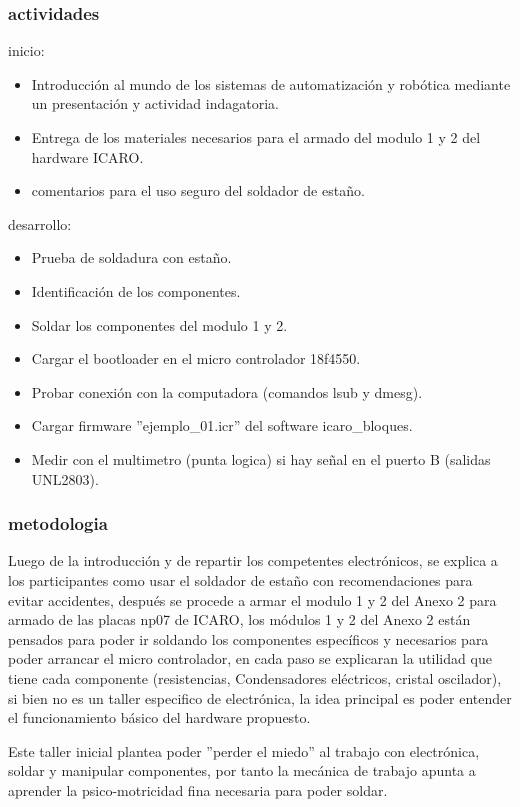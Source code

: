 \subsubsection{actividades}
inicio:
\begin{itemize}
  \item Introducción al mundo de los sistemas de automatización y robótica mediante un presentación y actividad indagatoria.
  \item Entrega de los materiales necesarios para el armado del modulo 1 y 2 del hardware ICARO.
  \item comentarios para el uso seguro del soldador de estaño.
\end{itemize}
desarrollo:
\begin{itemize}
  \item Prueba de soldadura con estaño.
  \item Identificación de los componentes.
  \item Soldar los componentes del modulo 1 y 2.
  \item Cargar el bootloader en el micro controlador 18f4550.
  \item Probar conexión con la computadora (comandos lsub y dmesg).
  \item Cargar firmware ''ejemplo\_01.icr'' del software icaro\_bloques.
  \item Medir con el multimetro (punta logica) si hay señal en el puerto B (salidas UNL2803).

\end{itemize}

\subsubsection{metodologia}

Luego de la introducción y de repartir los competentes electrónicos, se explica a los participantes como usar el soldador de estaño con recomendaciones para evitar accidentes, después se procede a armar el modulo 1 y 2 del Anexo 2 para armado de las placas np07 de ICARO, los módulos 1 y 2 del Anexo 2 están pensados para poder ir soldando los componentes específicos y necesarios para poder arrancar el micro controlador, en cada paso se explicaran la utilidad que tiene cada componente (resistencias, Condensadores eléctricos, cristal oscilador), si bien no es un taller especifico de electrónica, la idea principal es poder entender el funcionamiento básico del hardware propuesto.

Este taller inicial plantea poder ''perder el miedo'' al trabajo con electrónica, soldar y manipular componentes, por tanto la mecánica de trabajo apunta a aprender la psico-motricidad fina necesaria para poder soldar. 

